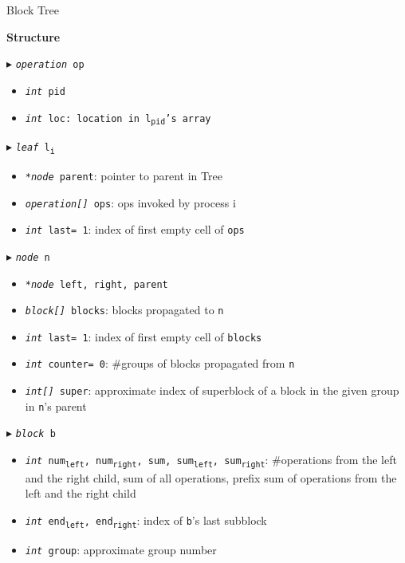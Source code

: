 \documentclass[10pt]{article}
\theoremstyle{definition}
\begin{document}
\begin{algorithm}
\caption{Block Tree \label{alg2}}
\begin{algorithmic}[1]
\begin{multicols}{2}

\Statex \textbf{Structure}

\Statex $\blacktriangleright$ \texttt{\textsl{operation} op}
\begin{itemize}
\item \texttt{\textsl{int} pid}
\item \texttt{\textsl{int} loc\textsf{: location in \texttt{l\textsubscript{pid}}'s array}}
\end{itemize}


\Statex $\blacktriangleright$ \texttt{\textsl{leaf} l\textsubscript{i}}
\begin{itemize}
\item \texttt{\textsl{*node} parent}\textsf{: pointer to parent in Tree}
\item \texttt{\textsl{operation[]} ops}\textsf{: ops invoked by process i}
\item \texttt{\textsl{int} last= 1}\textsf{: index of first empty cell of \texttt{ops}}
\end{itemize}


\Statex $\blacktriangleright$ \texttt{\textsl{node} n}
\begin{itemize}
\item \texttt{\textsl{*node} left, right, parent}
\item \texttt{\textsl{block[]} blocks}\textsf{: blocks propagated to \texttt{n}}
\item \texttt{\textsl{int} last= 1}\textsf{: index of first empty cell of \texttt{blocks}}
\item \texttt{\textsl{int} counter= 0}\textsf{: \#groups of blocks propagated from \texttt{n}}
\item \texttt{\textsl{int[]} super}\textsf{: approximate index of superblock of a block in the given group in \texttt{n}'s parent}
\end{itemize}



\Statex $\blacktriangleright$ \texttt{\textsl{block} b}
\begin{itemize}
  \item \texttt{\textsl{int} num\textsubscript{left}, num\textsubscript{right}, sum, sum\textsubscript{left}, sum\textsubscript{right}}\textsf{: \#operations from the left and the right child, sum of all operations, prefix sum of operations from the left and the right child}
  \item \texttt{\textsl{int} end\textsubscript{left}, end\textsubscript{right}}\textsf{: index of \texttt{b}'s last subblock}
  \item \texttt{\textsl{int} group}\textsf{: approximate group number}
\end{itemize}



\end{multicols}
\end{algorithmic}
\end{algorithm}
\end{document}
